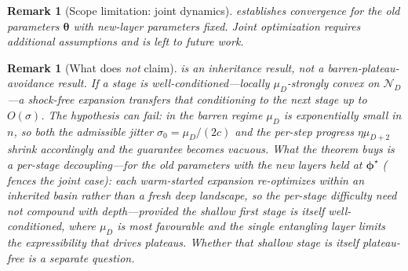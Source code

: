 \documentclass[11pt]{article}
\newcommand{\cN}{\mathcal{N}}
\theoremstyle{plain}
\theoremstyle{plain}
\newtheorem{remark}[theorem]{Remark}
\begin{document}
\begin{remark}[Scope limitation: joint dynamics]
\label{rem:joint_dynamics}
   establishes convergence for the old parameters
  $\bm\theta$ with new-layer parameters fixed.  Joint optimization
  requires additional assumptions and is left to future work.
\end{remark}
\begin{remark}[What  does \emph{not} claim]
\label{rem:basin_scope}
   is an \emph{inheritance} result, not a
  barren-plateau-avoidance result.  \emph{If} a stage is
  well-conditioned---locally $\mu_D$-strongly convex on $\cN_D$---a
  shock-free expansion transfers that conditioning to the next stage up
  to $O(\sigma)$.  The hypothesis can fail: in the barren regime $\mu_D$
  is exponentially small in $n$, so both the admissible jitter
  $\sigma_0=\mu_D/(2c)$ and the per-step progress $\eta\mu_{D+2}$ shrink
  accordingly and the guarantee becomes vacuous.  What the theorem buys
  is a \emph{per-stage} decoupling---for the old parameters with the new
  layers held at $\bm\phi^\star$ ( fences the
  joint case): each warm-started expansion re-optimizes within an
  \emph{inherited} basin rather than a fresh deep landscape, so the
  per-stage difficulty need not compound with depth---\emph{provided} the
  shallow first stage is itself well-conditioned, where $\mu_D$ is most
  favourable and the single entangling layer limits the expressibility
  that drives plateaus.  Whether that shallow stage is itself
  plateau-free is a separate question.
\end{remark}
\end{document}
